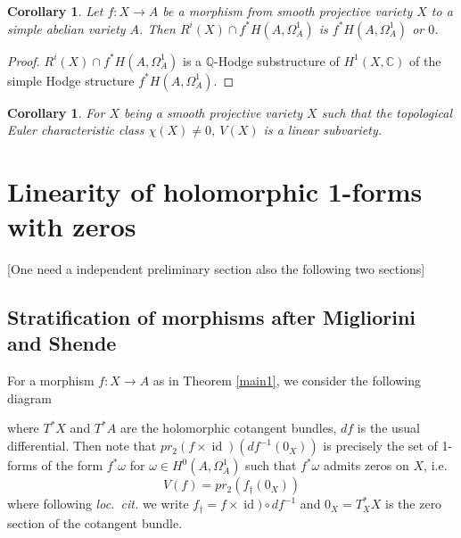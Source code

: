 \documentclass[a4paper,12pt,reqno]{amsart}
\theoremstyle{plain}
\newtheorem{corollary}[theorem]{Corollary}
\theoremstyle{remark}
\newcommand{\Q}{\mathbb Q}
\newcommand{\C}{\mathbb C}
\newcommand{\id}{\operatorname{id}}
\newcommand{\pr}{\operatorname{pr}}
\begin{document}
\begin{corollary}
Let $f:X\to A$ be a morphism from smooth projective variety $X$ to a simple abelian  variety $A$. Then $R^i(X)\cap f^*H(A, \Omega_A^1)$ is $f^*H(A, \Omega_A^1)$ or $0$.
\end{corollary}

\begin{proof}
$R^i(X)\cap f^*H(A, \Omega_A^1)$ is a $\Q$-Hodge substructure of $H^1(X, \C)$ of the simple Hodge structure $f^*H(A, \Omega_A^1)$.
\end{proof}

\begin{corollary}\label{ECNT}
For $X$ being a smooth projective variety $X$ such that the topological Euler characteristic class $\chi(X)\not=0$, $V(X)$ is a linear subvariety.
\end{corollary}


\section{Linearity of holomorphic 1-forms with zeros} [{\color{red}One need a independent preliminary section also the following two sections}]
%





\subsection{Stratification of morphisms after Migliorini and Shende}

For a morphism $f: X\to A$ as in Theorem \ref{main1},  we consider the following diagram 
\begin{center}
\end{center}
 where $T^*X$ and $T^*A$ are the holomorphic cotangent bundles, 
$df$ is the usual differential. Then note
that $pr_2(f\times \id)(df^{-1}(0_X))$ is precisely the 
set of 1-forms of the form $f^*\omega$ for $\omega\in H^0(A, \Omega_A^1)$ such that $f^*\omega$ admits zeros on $X$,
i.e.\
\[V(f) = pr_2(f_{\dagger}(0_X))\]
where following \emph{loc.\ cit.} we write $f_{\dagger} = f\times \id)\circ df^{-1}$ and $0_X = T_X^*X$ is the zero section
of the cotangent bundle. 
\end{document}
